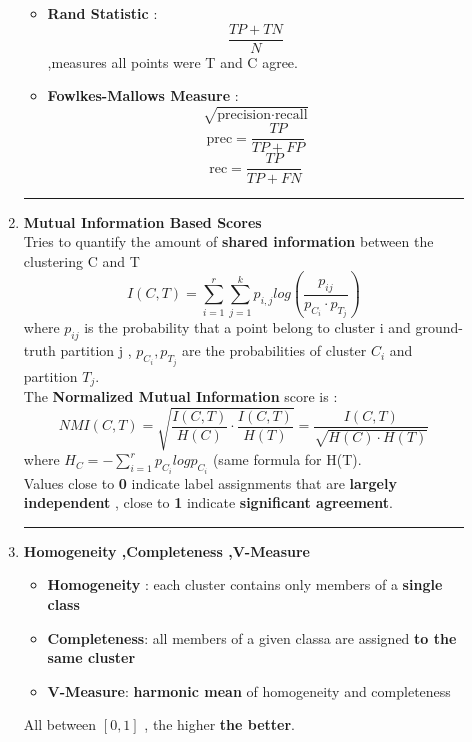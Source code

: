 \begin{description}
\begin{enumerate}
\begin{itemize}
\item \textbf{Rand Statistic} : 
$$\frac{TP+TN}{N}$$ ,measures all points were T and C agree.

\item \textbf{Fowlkes-Mallows Measure} : 
$$ \sqrt{\text{precision} \cdot \text{recall}}$$
$$\text{prec}= \frac{TP}{TP+FP} $$
$$ \text{rec}= \frac{TP}{TP+FN}$$
\end{itemize}

\begin{center}
\rule{0.8\textwidth}{.4pt}
\end{center}

\item \textbf{Mutual Information Based Scores}\\
Tries to quantify the amount of \textbf{shared information} between the clustering C and T $$I(C,T) = \sum \limits_{i=1}^{r} \sum \limits_{j=1}^{k} p_{i,j}log \left( \frac{p_{ij}}{p_{C_i} \cdot p_{T_j}} \right)$$
where $p_{ij}$ is the probability that a point belong to cluster i and ground-truth partition j , $p_{C_i} , p_{T_j}$ are the probabilities of cluster $C_i$ and partition $T_j$.\\
The \textbf{Normalized Mutual Information} score is :
$$ NMI(C,T) = \sqrt{\frac{I(C,T)}{H(C)} \cdot \frac{I(C,T)}{H(T)}} = \frac{I(C,T)}{\sqrt{H(C) \cdot H(T)}}$$ where $H_C = - \sum \limits_{i=1}^{r} p_{C_i} log p_{C_i} $ (same formula for H(T).\\
Values close to \textbf{0} indicate label assignments that are \textbf{largely independent} , close to \textbf{1} indicate \textbf{significant agreement}.

\begin{center}
\rule{0.8\textwidth}{.4pt}
\end{center}

\item \textbf{Homogeneity ,Completeness ,V-Measure}\\
\begin{itemize}
\item \textbf{Homogeneity} : each cluster contains only members of a \textbf{single class}
\item \textbf{Completeness}: all members of a given classa are assigned \textbf{to the same cluster}
\item \textbf{V-Measure}: \textbf{harmonic mean} of homogeneity and completeness
\end{itemize}
All between $[0,1]$ , the higher \textbf{the better}.
\end{enumerate}


\end{description}

